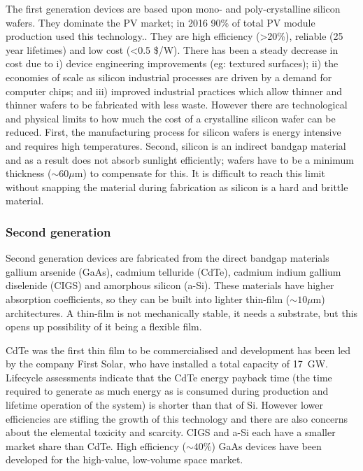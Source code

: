 The first generation devices are based upon mono- and poly-crystalline silicon wafers. They dominate the PV market; in 2016 90\% of total PV module production used this technology.\autocite{Jager-Waldau2017}. They are high efficiency (>20\%), reliable (25 year lifetimes) and low cost (<0.5 \$/W). There has been a steady decrease in cost due to i) device engineering improvements (eg: textured surfaces); ii) the economies of scale as silicon industrial processes are driven by a demand for computer chips; and iii) improved industrial practices which allow thinner and thinner wafers to be fabricated with less waste. However there are technological and physical limits to how much the cost of a crystalline silicon wafer can be reduced. First, the manufacturing process for silicon wafers is energy intensive and requires high temperatures. Second, silicon is an indirect bandgap material and as a result does not absorb sunlight efficiently; wafers have to be a minimum thickness ($\sim 60\mu \textrm{m}$) to compensate for this. It is difficult to reach this limit without snapping the material during fabrication as silicon is a hard and brittle material.

\subsubsection{Second generation}

Second generation devices are fabricated from the direct bandgap materials gallium arsenide (GaAs), cadmium telluride (CdTe), cadmium indium gallium diselenide (CIGS) and amorphous silicon (a-Si). These materials have higher absorption coefficients, so they can be built into lighter thin-film ($\sim 10\mu \textrm{m}$) architectures. A thin-film is not mechanically stable, it needs a substrate, but this opens up possibility of it being a flexible film.

CdTe was the first thin film to be commercialised and development has been led by the company First Solar, who have installed a total capacity of \SI{17}{\giga\watt}. Lifecycle assessments indicate that the CdTe energy payback time (the time required to generate as much energy as is consumed during production and lifetime operation of the system) is shorter than that of Si.\autocite{Koppelaar2017} However lower efficiencies are stifling the growth of this technology and there are also concerns about the elemental toxicity and scarcity. CIGS and a-Si each have a smaller market share than CdTe. High efficiency ($\sim 40\%$) GaAs devices have been developed for the high-value, low-volume space market.

